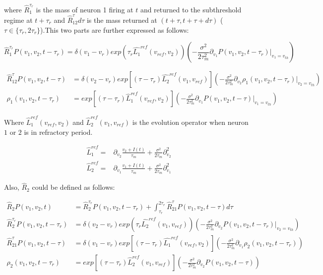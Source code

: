 \documentclass{article}
\begin{document}
	where $\hat{R}_1^{\tau_r}$ is the mass of neuron 1 firing at $t$ and returned to the subthreshold regime at $t+\tau_r$ and  $\hat{R}_{12}^{\tau}d\tau$ is the mass returned at $(t+\tau,t+\tau+d\tau)$ ($\tau \in \{\tau_r,2\tau_r\}$).This two parts are further expressed as follows:
	
	\begin{equation}
		\hat{R}_1^{\tau_r}P(v_1,v_2,t-\tau_r)=\delta(v_1-v_r)exp(\tau_r\hat{L_1}^{ref}(v_{ref},v_2))(-\frac{\sigma^2}{2\tau_m^2}\partial_{v_1}P(v_1,v_2,t-\tau_r)|_{v_1=v_{th}})
		\label{eq: R1 tau}
	\end{equation}
	
	\begin{align}
		\hat{R}_{12}^{\tau}P(v_1,v_2,t-\tau)&=\delta(v_2-v_r)exp[(\tau-\tau_r)\hat{L_2}^{ref}(v_1,v_{ref})](-\frac{\sigma^2}{2\tau_m^2}\partial_{v_2}\rho_1(v_1,v_2,t-\tau_r)|_{v_2=v_{th}})\\
		\rho_1(v_1,v_2,t-\tau_r)&=exp[(\tau-\tau_r)\hat{L}_1^{ref}(v_{ref},v_2)](-\frac{\sigma^2}{2\tau_m^2}\partial_{v_1}P(v_1,v_2,t-\tau)|_{v_1=v_{th}})
		\label{R12 tau}
	\end{align}
	
	Where $\hat{L}_1^{ref}(v_{ref},v_2)$ and $\hat{L}_2^{ref}(v_1,v_{ref})$ is the evolution operator when neuron $1$ or $2$ is in refractory period.
	
	\begin{align}
		\hat{L}_1^{ref}=&\partial_{v_2}\frac{v_2+I(t)}{\tau_m}+\frac{\sigma^2}{2\tau_m}\partial_{v_2}^2\\
		\hat{L}_2^{ref}=&\partial_{v_1}\frac{v_1+I(t)}{\tau_m}+\frac{\sigma^2}{2\tau_m}\partial_{v_1}^2
	\end{align}
	
	Also, $\hat{R}_2$ could be defined as follows:
	
	\begin{align}
		\hat{R}_2P(v_1,v_2,t)&=\hat{R}_2^{\tau_r}P(v_1,v_2,t-\tau_r)+\int_{\tau_r}^{2\tau_r}\hat{R}_{21}^{\tau}P(v_1,v_2,t-\tau)d\tau\\
		\hat{R}_2^{\tau_r}P(v_1,v_2,t-\tau_r)&=\delta(v_2-v_r)exp(\tau_r\hat{L_2}^{ref}(v_1,v_{ref}))(-\frac{\sigma^2}{2\tau_m^2}\partial_{v_2}P(v_1,v_2,t-\tau_r)|_{v_2=v_{th}})\\
		\hat{R}_{21}^{\tau}P(v_1,v_2,t-\tau)&=\delta(v_1-v_r)exp[(\tau-\tau_r)\hat{L_1}^{ref}(v_{ref},v_2)](-\frac{\sigma^2}{2\tau_m^2}\partial_{v_1}\rho_2(v_1,v_2,t-\tau_r))\\
		\rho_2(v_1,v_2,t-\tau_r)&=exp[(\tau-\tau_r)\hat{L}_2^{ref}(v_1,v_{ref})](-\frac{\sigma^2}{2\tau_m^2}\partial_{v_2}P(v_1,v_2,t-\tau))
	\end{align}
	
\end{document}
